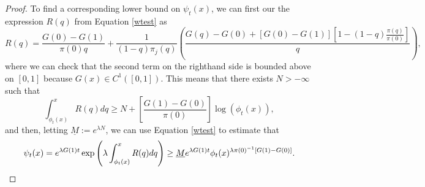 \documentclass[11pt]{article}
\numberwithin{equation}{section}
\begin{document}
{\begin{proof}
To find a corresponding lower bound on $\psi_t(x)$, we can first our the expression $R(q)$ from Equation \eqref{wtest} as
\begin{equation} \label{eq:Rqexpand} 
R(q) =  \frac{G(0) - G(1)}{\pi(0) q} + \frac{1}{(1-q) \pi_j(q)} \left( \frac{G(q) - G(0) + \left[G(0) - G(1)\right] \left[1 - (1-q) \frac{\pi(q)}{\pi(0)} \right]}{q} \right),
\end{equation}
where we can check that the second term on the righthand side is bounded above on $[0,1]$ because $G(x) \in C^1\left([0,1]\right)$. This means that there exists $N > -\infty$ such that 
\begin{equation}
\int_{\phi_t(x)}^x R(q) dq \geq N +   \left[\frac{G(1) - G(0)}{\pi(0)} \right] \log\left(\phi_t(x) \right), 
\end{equation}
and then, letting $\underline{M} := e^{\lambda N}$, we can use Equation \eqref{wtest} to estimate that
\begin{equation} \label{eq:wtlowerbound}
    \psi_t(x) = e^{\lambda G(1) t} \exp\left(\lambda \int_{\phi_t(x)}^x R(q) dq  \right) \geq \underline{M} e^{\lambda G(1) t} \phi_t(x)^{\lambda \pi(0)^{-1} \left[G(1) - G(0) \right]}.  \qedhere
\end{equation}
\end{proof}


}
\end{document}
